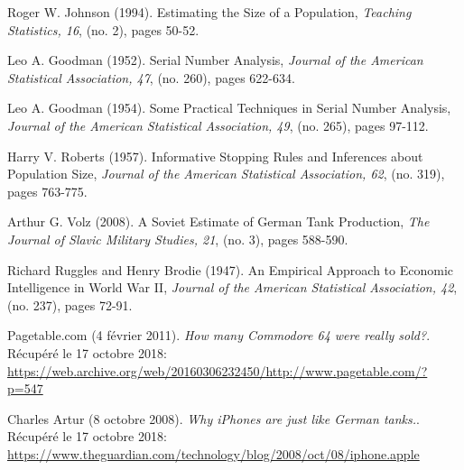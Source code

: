 \bigskip


\begin{thebibliography}{10}

 Roger W. Johnson (1994). Estimating the Size of a Population, {\em Teaching Statistics, 16}, (no. 2), pages 50-52.

 Leo A. Goodman (1952). Serial Number Analysis, {\em Journal of the American Statistical Association, 47}, (no. 260), pages 622-634.

 Leo A. Goodman (1954). Some Practical Techniques in Serial Number Analysis, {\em Journal of the American Statistical Association, 49}, (no. 265), pages 97-112.

 Harry V. Roberts (1957). Informative Stopping Rules and Inferences about Population Size, {\em Journal of the American Statistical Association, 62}, (no. 319), pages 763-775.

 Arthur G. Volz (2008). A Soviet Estimate of German Tank Production, {\em The Journal of Slavic Military Studies, 21}, (no. 3), pages 588-590.

 Richard Ruggles and Henry Brodie (1947). An Empirical Approach to Economic Intelligence in World War II, {\em Journal of the American Statistical Association, 42}, (no. 237), pages 72-91.

 Pagetable.com (4 février 2011). {\em How many Commodore 64 were really sold?}. Récupéré le 17 octobre 2018:  \href{https://web.archive.org/web/20160306232450/http://www.pagetable.com/?p=547}{https://web.archive.org/web/20160306232450/http://www.pagetable.com/?p=547}

 Charles Artur (8 octobre 2008). {\em Why iPhones are just like German tanks.}. Récupéré le 17 octobre 2018:  \href{https://www.theguardian.com/technology/blog/2008/oct/08/iphone.apple}{https://www.theguardian.com/technology/blog/2008/oct/08/iphone.apple}

\end{thebibliography}
